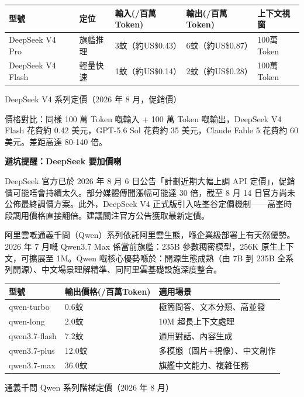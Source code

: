 \begin{center}
\begin{tabularx}{\linewidth}{|X|X|X|X|X|}
\hline
\textbf{型號} & \textbf{定位} & \textbf{輸入(/百萬Token)} & \textbf{輸出(/百萬Token)} & \textbf{上下文視窗} \tabularnewline
\hline
DeepSeek V4 Pro & 旗艦推理 & 3蚊（約US\$0.43） & 6蚊（約US\$0.87） & 100萬Token \tabularnewline
DeepSeek V4 Flash & 輕量快速 & 1蚊（約US\$0.14） & 2蚊（約US\$0.28） & 100萬Token \tabularnewline
\hline
\end{tabularx}
\end{center}

\begin{center}\small\color{gray}DeepSeek V4 系列定價（2026 年 8 月，促銷價）\end{center}

價格對比：同樣 100 萬 Token 嘅輸入 + 100 萬 Token 嘅輸出，DeepSeek V4 Flash 花費約 0.42 美元，GPT-5.6 Sol 花費約 35 美元，Claude Fable 5 花費約 60 美元。差距高達 80-140 倍。

\textbf{避坑提醒：DeepSeek 要加價喇}\par

DeepSeek 官方已於 2026 年 8 月 6 日公告「計劃近期大幅上調 API 定價」，促銷價可能唔會持續太久。部分媒體傳聞漲幅可能達 30 倍，截至 8 月 14 日官方尚未公佈最終調價方案。此外，DeepSeek V4 正式版引入咗峯谷定價機制——高峯時段調用價格直接翻倍。建議關注官方公告獲取最新定價。


阿里雲嘅通義千問（Qwen）系列依託阿里雲生態，喺企業級部署上有天然優勢。2026 年 7 月嘅 Qwen3.7 Max 係當前旗艦：235B 參數稠密模型，256K 原生上下文，可擴展至 1M。Qwen 嘅核心優勢喺於：開源生態成熟（由 7B 到 235B 全系列開源）、中文場景理解精準、同阿里雲基礎設施深度整合。

\begin{center}
\begin{tabularx}{\linewidth}{|X|X|X|}
\hline
\textbf{型號} & \textbf{輸出價格(/百萬Token)} & \textbf{適用場景} \tabularnewline
\hline
qwen-turbo & 0.6蚊 & 極簡問答、文本分類、高並發 \tabularnewline
qwen-long & 2.0蚊 & 10M 超長上下文處理 \tabularnewline
qwen3.7-flash & 7.2蚊 & 通用對話、內容生成 \tabularnewline
qwen3.7-plus & 12.0蚊 & 多模態（圖片+視像）、中文創作 \tabularnewline
qwen3.7-max & 36.0蚊 & 旗艦中文能力、複雜任務 \tabularnewline
\hline
\end{tabularx}
\end{center}

\begin{center}\small\color{gray}通義千問 Qwen 系列階梯定價（2026 年 8 月）\end{center}

